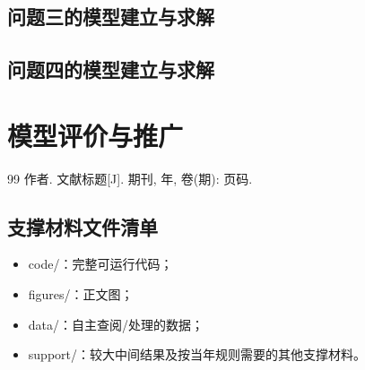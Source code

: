 \documentclass[withoutpreface]{cumcmthesis}
\begin{document}
\subsection{问题三的模型建立与求解}

\subsection{问题四的模型建立与求解}

\section{模型评价与推广}

\begin{thebibliography}{99}
 作者. 文献标题[J]. 期刊, 年, 卷(期): 页码.
\end{thebibliography}

\begin{appendices}
\section{支撑材料文件清单}
\begin{itemize}
\item code/：完整可运行代码；
\item figures/：正文图；
\item data/：自主查阅/处理的数据；
\item support/：较大中间结果及按当年规则需要的其他支撑材料。
\end{itemize}
\end{appendices}
\end{document}
